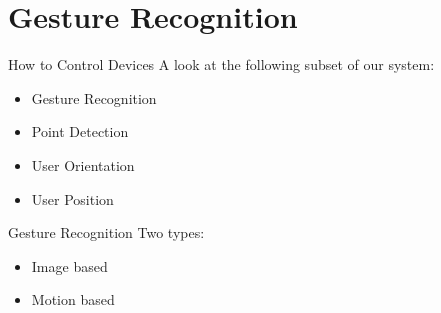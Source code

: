\section{Gesture Recognition}

\begin{frame}{How to Control Devices}{}
A look at the following subset of our system:
\begin{itemize}
    \item Gesture Recognition
    \item Point Detection
    \item User Orientation
    \item User Position
\end{itemize}
\end{frame}

\begin{frame}{Gesture Recognition}{}
Two types:
\begin{itemize}
    \item Image based
    \item Motion based
\end{itemize}
\end{frame}

